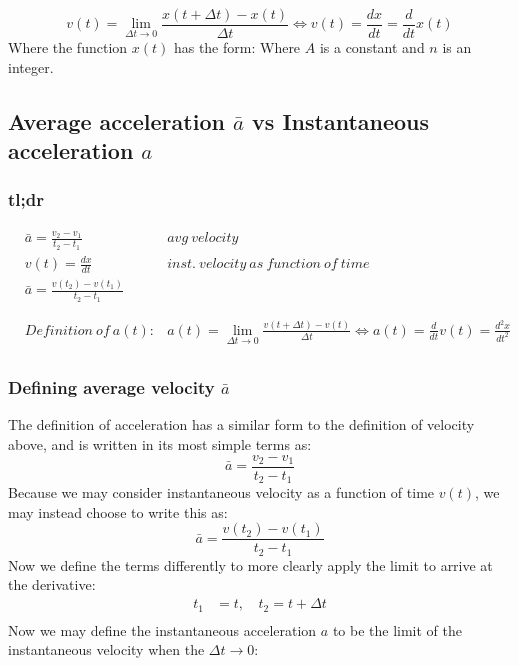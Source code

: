 \documentclass{article}
\numberwithin{equation}{section}
\begin{document}
\begin{equation}\label{eq:defnv}
    v(t) = \lim_{\Delta t\to0} 
    \frac{x(t+\Delta t)-x(t)}{\Delta t}  
    \iff v(t) = \frac{dx}{dt}
    = \frac{d}{dt}x(t)
  \end{equation}
Where the function $x(t)$ has the form:
Where $A$ is a constant and $n$ is an integer.

 \subsection{Average acceleration $\bar{a}$ vs Instantaneous
   acceleration $a$}
   \subsubsection{tl;dr}
\[
  \begin{aligned}
    &\bar{a} = \frac{v_2 - v_1}{t_2 - t_1} & avg\ velocity\\ 
    &v(t) = \frac{dx}{dt} & inst.\ velocity\ as\ function\ of\ time \\ 
    & \bar{a} = \frac{v(t_2)-v(t_1)}{t_2 - t_1} & \\
    & & \\
    \hline{}\\
    & Definition\ of\ a(t):
    & a(t) = \lim_{\Delta t\to0} 
    \frac{v(t+\Delta t)-v(t)}{\Delta t}  
    \iff a(t) = \frac{d}{dt}v(t) = \frac{d^2x}{dt^2}  \\
  \end{aligned}
\]
   \subsubsection{Defining average velocity $\bar{a}$}
   The definition of acceleration has a similar form to the definition
   of velocity above, and is written in its most simple terms as:\\ 
   \[
     \bar{a} = \frac{v_2 - v_1}{t_2 - t_1}
  \]
   Because we may consider instantaneous velocity as a function of
   time $v(t)$, we may instead choose to write this as:\\ 
   \[
     \bar{a} = \frac{v(t_2) - v(t_1)}{t_2 - t_1}
  \]
  Now we define the terms differently to more clearly apply the limit
  to arrive at the derivative:\\
  
 \[
   \begin{aligned}
     t_1 &= t \text{, } & t_2= t + \Delta t  \\
   \end{aligned}
 \]
 Now we may define the instantaneous acceleration $a$ to be the limit
 of the instantaneous velocity when the $\Delta t \to 0$:
 
\end{document}
